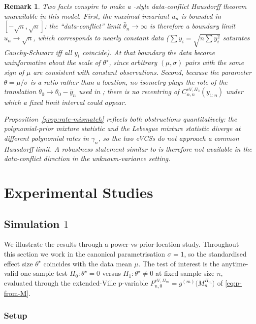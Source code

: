\documentclass{article}%
\newtheorem{remark}[theorem]{Remark}
\newcommand{\1}{\mathbf{1}}
\begin{document}
\begin{remark}\label{rem:why-no-data-conflict}
Two facts conspire to make a \cite{Cortinovis2025}-style data-conflict Hausdorff theorem unavailable in this model. First, the maximal-invariant \(u_n\) is bounded in \([-\sqrt n,\sqrt n]\): the ``data-conflict'' limit \(\widehat\theta_n\to\infty\) is therefore a boundary limit \(u_n\to\sqrt n\), which corresponds to nearly constant data (\(\sum y_i=\sqrt{n\sum y_i^2}\) saturates Cauchy-Schwarz iff all \(y_i\) coincide). At that boundary the data
become uninformative about the scale of \(\theta^\star\), since arbitrary \((\mu,\sigma)\) pairs with the same sign of \(\mu\) are consistent with constant observations. Second, because the parameter \(\theta=\mu/\sigma\) is a ratio rather than a location, no isometry plays the role of the translation
\(\theta_0\mapsto\theta_0-\bar y_n\) used in \cite[Theorem~4.3]{Cortinovis2025}; there is no recentring of \(C^{eV,\Pi_0}_{\alpha,n}(y_{1:n})\) under which a fixed limit interval could appear.

Proposition~\ref{prop:rate-mismatch} reflects both obstructions quantitatively: the polynomial-prior mixture statistic and the Lebesgue mixture statistic diverge at different polynomial rates in \(\gamma_n\), so the two eVCSs do not approach a common Hausdorff limit. A robustness statement similar to \cite{Cortinovis2025} is therefore not available in the data-conflict direction in the unknown-variance setting.
\end{remark}

\section{Experimental Studies}
\subsection{Simulation $1$}\label{sec:sim1}
We illustrate the results through a power-vs-prior-location study. Throughout this section we work in the
canonical parametrisation \(\sigma=1\), so the standardised effect
size \(\theta^\star\) coincides with the data mean \(\mu\). The test
of interest is the anytime-valid one-sample test
\(H_0:\theta^\star=0\) versus \(H_1:\theta^\star\neq 0\) at fixed
sample size \(n\), evaluated through the extended-Ville p-variable
\(P_{n,0}^{eV,\Pi_m}=g^{(m)}\bigl(M_n^{\Pi_m}\bigr)\) of
\eqref{eq:p-from-M}.


\subsubsection{Setup}\label{ssec:exp-setup}
\end{document}
